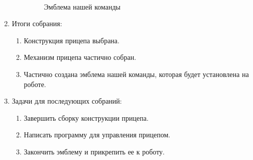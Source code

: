 \begin{enumerate}
\begin{enumerate}
	    \begin{figure}[H]
			\begin{minipage}[h]{0.2\linewidth}
				\center  
			\end{minipage}
			\begin{minipage}[h]{0.6\linewidth}
				\caption{Эмблема нашей команды}
			\end{minipage}
		\end{figure}
		
	\end{enumerate}
	
	\item Итоги собрания: \newline
	\begin{enumerate}
		\item Конструкция прицепа выбрана.\newline
		
		\item Механизм прицепа частично собран.\newline
		
		\item Частично создана эмблема нашей команды, которая будет установлена на роботе.\newline
		
	\end{enumerate}
	
	\item Задачи для последующих собраний:\newline
	\begin{enumerate}
		\item Завершить сборку конструкции прицепа.\newline
		
		\item Написать программу для управления прицепом.\newline
		
		\item Закончить эмблему и прикрепить ее к роботу.\newline
		
	\end{enumerate}     
\end{enumerate}

\fillpage


